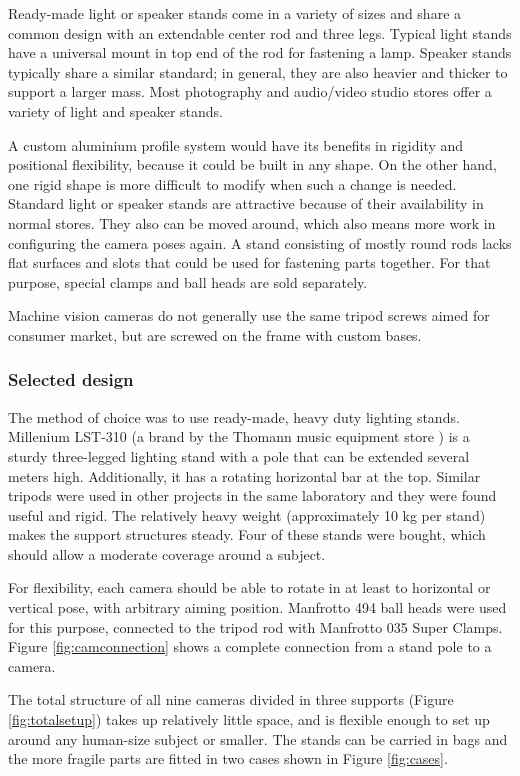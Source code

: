 Ready-made light or speaker stands come in a variety of sizes and share a common design with an extendable center rod and three legs.
Typical light stands have a universal mount in top end of the rod for fastening a lamp.
Speaker stands typically share a similar standard; in general, they are also heavier and thicker to support a larger mass.
Most photography and audio/video studio stores offer a variety of light and speaker stands.

A custom aluminium profile system would have its benefits in rigidity and positional flexibility, because it could be built in any shape.
On the other hand, one rigid shape is more difficult to modify when such a change is needed.
Standard light or speaker stands are attractive because of their availability in normal stores.
They also can be moved around, which also means more work in configuring the camera poses again.
A stand consisting of mostly round rods lacks flat surfaces and slots that could be used for fastening parts together.
For that purpose, special clamps and ball heads are sold separately.

Machine vision cameras do not generally use the same tripod screws aimed for consumer market, but are screwed on the frame with custom bases.

\subsubsection{Selected design}

The method of choice was to use ready-made, heavy duty lighting stands.
Millenium LST-310 (a brand by the Thomann music equipment store \cite{thomann}) is a sturdy three-legged lighting stand with a pole that can be extended several meters high.
Additionally, it has a rotating horizontal bar at the top.
Similar tripods were used in other projects in the same laboratory and they were found useful and rigid.
The relatively heavy weight (approximately 10 kg per stand) makes the support structures steady.
Four of these stands were bought, which should allow a moderate coverage around a subject.

For flexibility, each camera should be able to rotate in at least to horizontal or vertical pose, with arbitrary aiming position.
Manfrotto 494 ball heads were used for this purpose, connected to the tripod rod with Manfrotto 035 Super Clamps.
Figure \ref{fig:camconnection} shows a complete connection from a stand pole to a camera.

The total structure of all nine cameras divided in three supports (Figure \ref{fig:totalsetup}) takes up relatively little space, and is flexible enough to set up around any human-size subject or smaller.
The stands can be carried in bags and the more fragile parts are fitted in two cases shown in Figure \ref{fig:cases}.

